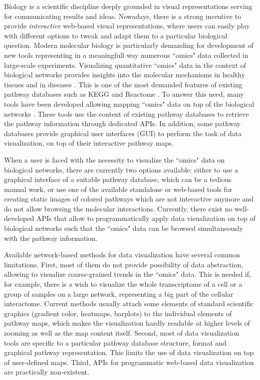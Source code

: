 \documentclass[a4,center,fleqn]{NAR}
\begin{document}
Biology is a scientific discipline deeply grounded in visual representations
serving for communicating results and ideas. Nowadays, there is a strong
incentive to provide \emph{interactive} web-based visual representations, where
users can easily play with different options to tweak and adapt them to a particular biological question. Modern
molecular biology is particularly demanding for development of new tools
representing in a meaningfull way numerous ``omics" data collected in
large-scale experiments. Visualizing quantitative ``omics" data in the context
of biological networks provides insights into the molecular mechanisms in
healthy tissues and in diseases \cite{Gehlenborg2010,Barillot2012}. This is one of
the most demanded features of existing pathway databases such as KEGG
and Reactome \cite{Kanehisa2012, Croft2014}. To answer this need, many tools
have been developed allowing mapping ``omics" data on top of the biological
networks \cite{Arakawa2005,vanIersel2008,Luo2013, Nishida2014}. These tools use
the content of existing pathway databases to retrieve the pathway information
through dedicated APIs. In addition, some pathway databases provide graphical
user interfaces (GUI) to perform the task of data visualization, on top of
their interactive pathway maps.

When a user is faced with the necessity to visualize the ``omics" data on 
biological networks, there are currently two options available: either to use
a graphical interface of a suitable pathway database, which can be a tedious manual work, or use
one of the available standalone or web-based tools for creating static images
of colored pathways which are not interactive anymore and do not allow browsing
the molecular interactions. Currently, there exist no well-developed APIs
that allow to programmatically apply data visualization on top of biological
networks such that the ``omics" data can be browsed simultaneously with the
pathway information.

Available network-based methods for data visualization have several common
limitations. First, most of them do not provide possibility of data
abstraction, allowing to visualize coarse-grained trends in the ``omics" data.
This is needed if, for example, there is a wish to visualize the whole
transcriptome of a cell or a group of samples on a large network,
representing a big part of the cellular interactome. Current methods usually attach
some elements of standard scientific graphics (gradient color, heatmaps,
barplots) to the individual elements of pathway maps, which makes the
visualization hardly readable at higher levels of zooming as well as the map
content itself. Second, most of data visualization tools are specific to a
particular pathway database structure, format and graphical pathway
representation. This limits the use of data visualization on top of
user-defined maps. Third, APIs for programmatic web-based data
visualization are practically non-existent.
\end{document}
